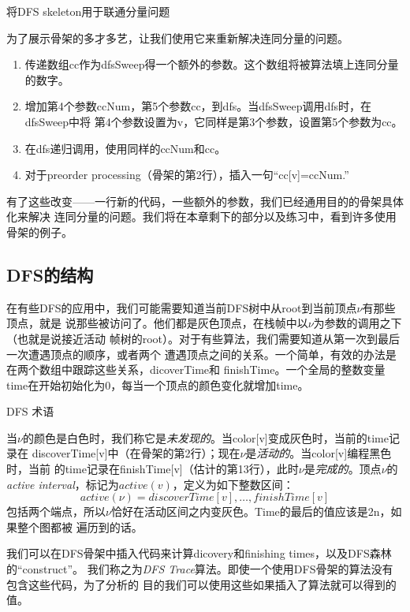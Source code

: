 \begin{example}
将DFS skeleton用于联通分量问题

为了展示骨架的多才多艺，让我们使用它来重新解决连同分量的问题。
\begin{enumerate}
\item 传递数组cc作为dfsSweep得一个额外的参数。这个数组将被算法填上连同分量的数字。
\item 增加第4个参数ccNum，第5个参数cc，到dfs。当dfsSweep调用dfs时，在dfsSweep中将
第4个参数设置为v，它同样是第3个参数，设置第5个参数为cc。
\item 在dfs递归调用，使用同样的ccNum和cc。
\item 对于preorder processing（骨架的第2行），插入一句“cc[v]=ccNum.”
\end{enumerate}
有了这些改变——一行新的代码，一些额外的参数，我们已经通用目的的骨架具体化来解决
连同分量的问题。我们将在本章剩下的部分以及练习中，看到许多使用骨架的例子。
\end{example}

\subsection{DFS的结构}
在有些DFS的应用中，我们可能需要知道当前DFS树中从root到当前顶点$\nu$有那些顶点，就是
说那些被访问了。他们都是灰色顶点，在栈帧中以$\nu$为参数的调用之下（也就是说接近活动
帧树的root）。对于有些算法，我们需要知道从第一次到最后一次遭遇顶点的顺序，或者两个
遭遇顶点之间的关系。一个简单，有效的办法是在两个数组中跟踪这些关系，dicoverTime和
finishTime。一个全局的整数变量time在开始初始化为0，每当一个顶点的颜色变化就增加time。

\begin{definition}\label{Def:DFSTerminology}
DFS 术语

当$\nu$的颜色是白色时，我们称它是\emph{未发现的}。当color[v]变成灰色时，当前的time记录在
discoverTime[v]中（在骨架的第2行）；现在$\nu$是\emph{活动的}。当color[v]编程黑色时，当前
的time记录在finishTime[v]（估计的第13行），此时$\nu$是\emph{完成的}。顶点$\nu$的
\emph{active interval}，标记为$active(v)$，定义为如下整数区间：
\begin{displaymath}
active(\nu) = discoverTime[v], \ldots, finishTime[v]
\end{displaymath}
包括两个端点，所以$\nu$恰好在活动区间之内变灰色。Time的最后的值应该是2n，如果整个图都被
遍历到的话。
\end{definition}

我们可以在DFS骨架中插入代码来计算dicovery和finishing times，以及DFS森林的“construct”。
我们称之为\emph{DFS Trace}算法。即使一个使用DFS骨架的算法没有包含这些代码，为了分析的
目的我们可以使用这些如果插入了算法就可以得到的值。

